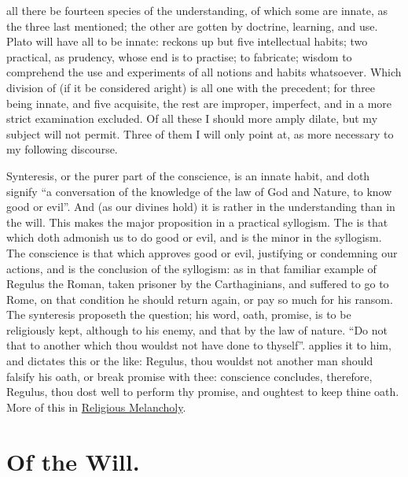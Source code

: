 all there be fourteen species of the understanding, of which some are innate,
as the three last mentioned; the other are gotten by doctrine, learning, and
use. Plato will have all to be innate: \Aristotle{} reckons up but five
intellectual habits; two practical, as prudency, whose end is to practise; to
fabricate; wisdom to comprehend the use and experiments of all notions and
habits whatsoever. Which division of \Aristotle{} (if it be considered aright) is
all one with the precedent; for three being innate, and five acquisite, the
rest are improper, imperfect, and in a more strict examination excluded. Of all
these I should more amply dilate, but my subject will not permit. Three of them
I will only point at, as more necessary to my following discourse.

Synteresis, or the purer part of the conscience, is an innate habit, and doth
signify \enquote{a conversation of the knowledge of the law of God and Nature, to know
good or evil}. And (as our divines hold) it is rather in the understanding than
in the will. This makes the major proposition in a practical syllogism. The
 is that which doth admonish us to do good or evil, and
is the minor in the syllogism. The conscience is that which approves good or
evil, justifying or condemning our actions, and is the conclusion of the
syllogism: as in that familiar example of Regulus the Roman, taken prisoner by
the Carthaginians, and suffered to go to Rome, on that condition he should
return again, or pay so much for his ransom. The synteresis proposeth the
question; his word, oath, promise, is to be religiously kept, although to his
enemy, and that by the law of nature. \enquote{Do not that to
another which thou wouldst not have done to thyself}.  applies it to
him, and dictates this or the like: Regulus, thou wouldst not another man
should falsify his oath, or break promise with thee: conscience concludes,
therefore, Regulus, thou dost well to perform thy promise, and oughtest to keep
thine oath. More of this in \hyperref[ch:religious-melancholy]{Religious
Melancholy}.

\section{Of the Will.}

